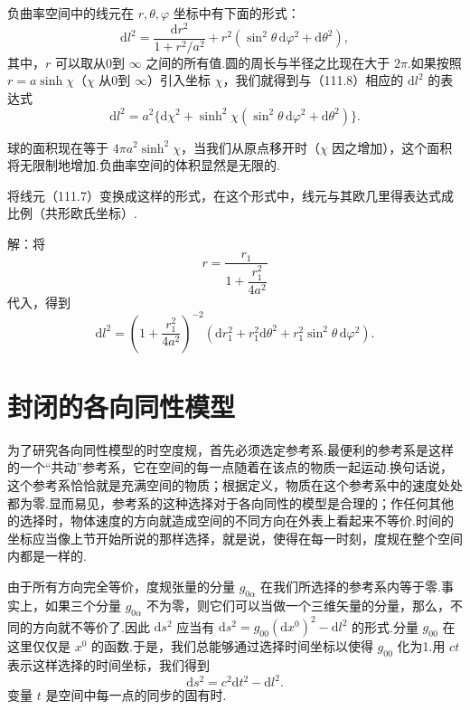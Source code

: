 负曲率空间中的线元在 $r,\theta,\varphi$ 坐标中有下面的形式：
\begin{equation}
  \mathrm{d}l^{2}=\frac{\mathrm{d}r^{2}}{1+r^{2}/a^{2}}
  +r^{2}(\sin^{2}\theta\,\mathrm{d}\varphi^{2}+\mathrm{d}\theta^{2}),
\end{equation}
其中，$r$ 可以取从0到 $\infty$ 之间的所有值.圆的周长与半径之比现在大于 $2\pi$.如果按照 $r=a\sinh\chi$（$\chi$ 从0到 $\infty$）引入坐标 $\chi$，我们就得到与（111.8）相应的 $\mathrm{d}l^{2}$ 的表达式
\begin{equation}
  \mathrm{d}l^{2}=a^{2}\{\mathrm{d}\chi^{2}
  +\sinh^{2}\chi(\sin^{2}\theta\,\mathrm{d}\varphi^{2}+\mathrm{d}\theta^{2})\}.
\end{equation}

球的面积现在等于 $4\pi a^{2}\sinh^{2}\chi$，当我们从原点移开时（$\chi$ 因之增加），这个面积将无限制地增加.负曲率空间的体积显然是无限的.

\begin{xiti}

\quad 将线元（111.7）变换成这样的形式，在这个形式中，线元与其欧几里得表达式成比例（共形欧氏坐标）.

解：将
\begin{equation*}
  r=\frac{r_{1}}{1+\dfrac{r_{1}^{2}}{4a^{2}}}
\end{equation*}
代入，得到
\begin{equation*}
  \mathrm{d}l^{2}=\left(1+\frac{r_{1}^{2}}{4a^{2}}\right)^{-2}
  (\mathrm{d}r_{1}^{2}+r_{1}^{2}\mathrm{d}\theta^{2}
  +r_{1}^{2}\sin^{2}\theta\,\mathrm{d}\varphi^{2}).
\end{equation*}

\end{xiti}

\section{封闭的各向同性模型}

为了研究各向同性模型的时空度规，首先必须选定参考系.最便利的参考系是这样的一个“共动”参考系，它在空间的每一点随着在该点的物质一起运动.换句话说，这个参考系恰恰就是充满空间的物质；根据定义，物质在这个参考系中的速度处处都为零.显而易见，参考系的这种选择对于各向同性的模型是合理的；作任何其他的选择时，物体速度的方向就造成空间的不同方向在外表上看起来不等价.时间的坐标应当像上节开始所说的那样选择，就是说，使得在每一时刻，度规在整个空间内都是一样的.

由于所有方向完全等价，度规张量的分量 $g_{0\alpha}$ 在我们所选择的参考系内等于零.事实上，如果三个分量 $g_{0\alpha}$ 不为零，则它们可以当做一个三维矢量的分量，那么，不同的方向就不等价了.因此 $\mathrm{d}s^{2}$ 应当有 $\mathrm{d}s^{2}=g_{00}(\mathrm{d}x^{0})^{2}-\mathrm{d}l^{2}$ 的形式.分量 $g_{00}$ 在这里仅仅是 $x^{0}$ 的函数.于是，我们总能够通过选择时间坐标以使得 $g_{00}$ 化为1.用 $ct$ 表示这样选择的时间坐标，我们得到
\begin{equation}
  \mathrm{d}s^{2}=c^{2}\mathrm{d}t^{2}-\mathrm{d}l^{2}.
\end{equation}
变量 $t$ 是空间中每一点的同步的固有时.


